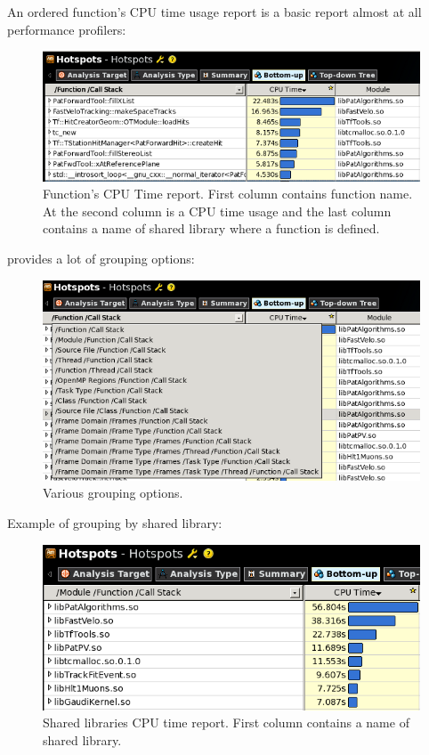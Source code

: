 \documentclass[a4paper]{jpconf}
\begin{document}
An ordered function’s CPU time usage report is a basic report almost at all performance profilers:

\begin{figure}[H]
\begin{minipage}{\textwidth}
\includegraphics[width=\textwidth]{figs/fig01.png}
\caption{\label{fig01}Function’s CPU Time report. First column contains function name. At the second column is a CPU 
time usage and the last column contains a name of shared library where a function is defined.}
\end{minipage}
\end{figure}

\amp provides a lot of grouping options: 
\begin{figure}[H]
\begin{minipage}{\textwidth}
\includegraphics[width=\textwidth]{figs/fig02.png}
\caption{\label{fig02}Various grouping options.}
\end{minipage}
\end{figure}

Example of grouping by shared library:

\begin{figure}[H]
\begin{minipage}{\textwidth}
\includegraphics[width=\textwidth]{figs/fig03.png}
\caption{\label{fig03}Shared libraries  CPU time report. First column contains a name of shared library.}
\end{minipage}
\end{figure}
\end{document}
